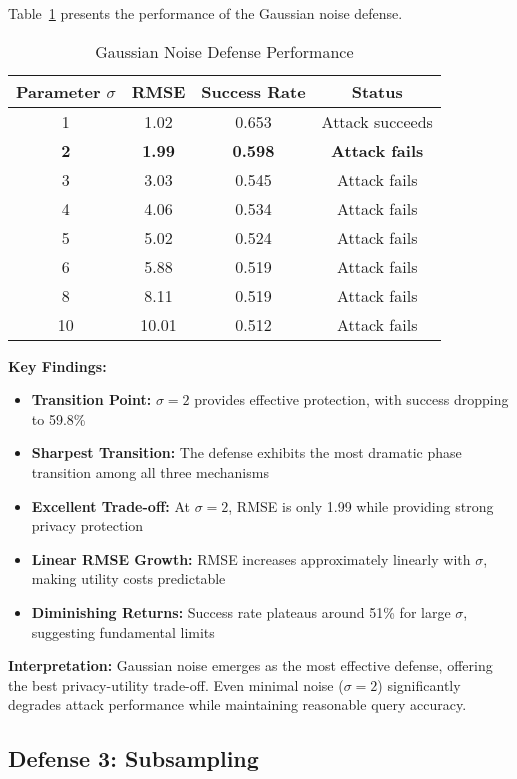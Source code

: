 \documentclass[11pt,letterpaper]{article}
\begin{document}
Table~\ref{tab:noise} presents the performance of the Gaussian noise defense.

\begin{table}[H]
\centering
\caption{Gaussian Noise Defense Performance}
\label{tab:noise}
\begin{tabular}{@{}cccc@{}}
\toprule
\textbf{Parameter $\sigma$} & \textbf{RMSE} & \textbf{Success Rate} & \textbf{Status} \\ \midrule
1 & 1.02 & 0.653 & Attack succeeds \\
\textbf{2} & \textbf{1.99} & \textbf{0.598} & \textbf{Attack fails} \\
3 & 3.03 & 0.545 & Attack fails \\
4 & 4.06 & 0.534 & Attack fails \\
5 & 5.02 & 0.524 & Attack fails \\
6 & 5.88 & 0.519 & Attack fails \\
8 & 8.11 & 0.519 & Attack fails \\
10 & 10.01 & 0.512 & Attack fails \\ \bottomrule
\end{tabular}
\end{table}

\textbf{Key Findings:}

\begin{itemize}[leftmargin=*]
    \item \textbf{Transition Point:} $\sigma = 2$ provides effective protection, with success dropping to 59.8\%
    \item \textbf{Sharpest Transition:} The defense exhibits the most dramatic phase transition among all three mechanisms
    \item \textbf{Excellent Trade-off:} At $\sigma = 2$, RMSE is only 1.99 while providing strong privacy protection
    \item \textbf{Linear RMSE Growth:} RMSE increases approximately linearly with $\sigma$, making utility costs predictable
    \item \textbf{Diminishing Returns:} Success rate plateaus around 51\% for large $\sigma$, suggesting fundamental limits
\end{itemize}

\textbf{Interpretation:} Gaussian noise emerges as the most effective defense, offering the best privacy-utility trade-off. Even minimal noise ($\sigma = 2$) significantly degrades attack performance while maintaining reasonable query accuracy.

\subsection{Defense 3: Subsampling}
\end{document}
